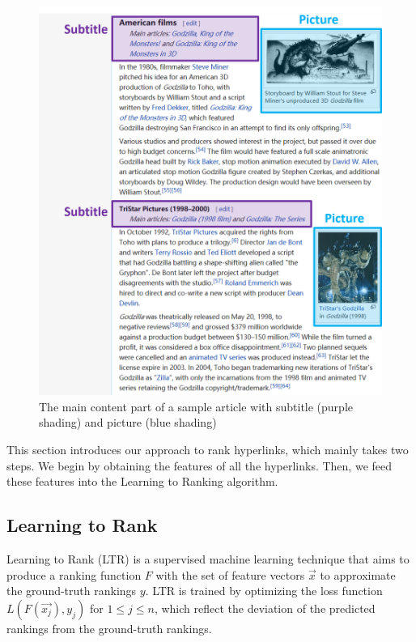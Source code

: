 \begin{figure}[t]
\centering
\includegraphics[width=1\columnwidth]{vis_example2}
\caption{The main content part of a sample article with subtitle (purple shading) and picture (blue shading)}
\label{vis_example2}
\end{figure}

This section introduces our approach to rank hyperlinks, which mainly takes two steps. We begin by obtaining the features of all the hyperlinks. Then, we feed these features into the Learning to Ranking algorithm.

\subsection{Learning to Rank}

Learning to Rank (LTR) is a supervised machine learning technique that aims to produce a ranking function $F$ with the set of feature vectors $\vec{x}$ to approximate the ground-truth rankings $y$. LTR is trained by optimizing the loss function $L(F(\vec{x_j}), y_j)$ for $1 \leq j \leq n$, which reflect the deviation of the predicted rankings from the ground-truth rankings. 

